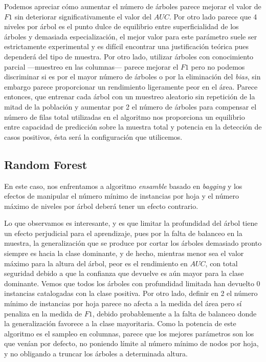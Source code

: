 \documentclass{article}
\newcommand{\img}[2]{
\noindent\makebox[\textwidth][c]{\texttt{[image: \#1]}}%
}
\begin{document}
\img{gbtuning}{1.2}

Podemos apreciar cómo aumentar el número de árboles parece mejorar el valor de $F1$ sin deteriorar significativamente el valor del $AUC$. Por otro lado parece que 4 niveles por árbol es el punto dulce de equilibrio entre superficialidad de los árboles y demasiada especialización, el mejor valor para este parámetro suele ser estrictamente experimental y es difícil encontrar una justificación teórica pues dependerá del tipo de muestra. Por otro lado, utilizar árboles con conocimiento parcial  ---muestreo en las columnas--- parece mejorar el $F1$ pero no podemos discriminar si es por el mayor número de árboles o por la eliminación del \textit{bias}, sin embargo parece proporcionar un rendimiento ligeramente peor en el área. Parece entonces, que entrenar cada árbol con un muestreo aleatorio sin repetición de la mitad de la población y aumentar por 2 el número de árboles para compensar el número de filas total utilizadas en el algoritmo nos proporciona un equilibrio entre capacidad de predicción sobre la muestra total y potencia en la detección de casos positivos, ésta será la configuración que utilicemos.

\subsection{Random Forest}

En este caso, nos enfrentamos a algoritmo \textit{ensamble} basado en \textit{bagging} y los efectos de manipular el número mínimo de instancias por hoja y el número máximo de niveles por árbol deberá tener un efecto contrario.

\img{rftuning}{1.2}

Lo que observamos es interesante, y es que limitar la profundidad del árbol tiene un efecto perjudicial para el aprendizaje, pues por la falta de balanceo en la muestra, la generalización que se produce por cortar los árboles demasiado pronto siempre es hacia la clase dominante, y de hecho, mientras menor sea el valor máximo para la altura del árbol, peor es el rendimiento en $AUC$, con total seguridad debido a que la confianza que devuelve es aún mayor para la clase dominante. Vemos que todos los árboles con profundidad limitada han devuelto 0 instancias catalogadas con la clase positiva. Por otro lado, definir en 2 el número mínimo de instancias por hoja parece no afecta a la medida del área pero sí penaliza en la medida de $F1$, debido probablemente a la falta de balanceo donde la generalización favorece a la clase mayoritaria. Como la potencia de este algoritmo es el sampleo en columnas, parece que los mejores parámetros son los que venían por defecto, no poniendo límite al número mínimo de nodos por hoja, y no obligando a truncar los árboles a determinada altura. 
\end{document}
